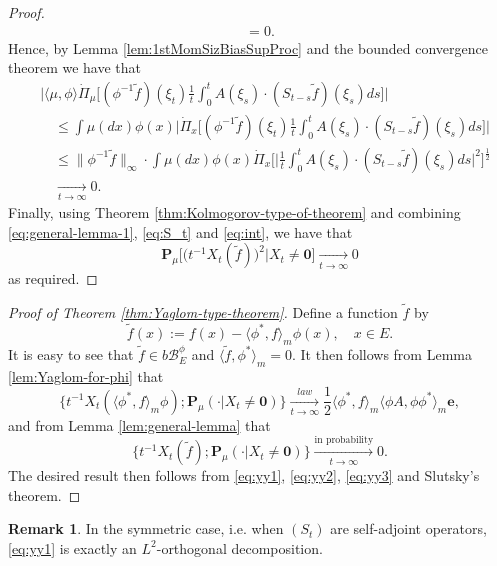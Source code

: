 \documentclass[UTF8]{pkuthss}
\theoremstyle{plain}
\theoremstyle{definition}
\newtheorem{rem}[thm]{Remark}
\numberwithin{equation}{section}
\begin{document}
\begin{proof}
\begin{align}
	= 0.
\end{align}
	Hence, by Lemma \ref{lem:1stMomSizBiasSupProc} and the bounded convergence theorem we have that
\begin{align}\label{eq:int}
	&\big| \langle \mu , \phi \rangle \dot{\Pi}_{\mu}\big[(\phi^{-1}\tilde f)(\xi_t)\frac{1}{t}\int_0^t A(\xi_s)\cdot (S_{t-s} \tilde f)(\xi_s)ds\big]\big|\\
	&\quad\leq \int \mu(dx)\phi(x) \big|\dot{\Pi}_x \big[(\phi^{-1}\tilde f)(\xi_t)\frac{1}{t}\int_0^t A(\xi_s)\cdot (S_{t-s} \tilde f)(\xi_s)ds\big]\big| \\
	&\quad\leq \|\phi^{-1} \tilde f\|_\infty \cdot \int \mu(dx)\phi(x) \dot{\Pi}_{x}\Big[ \big| \frac{1}{t}\int_0^t A(\xi_s)\cdot (S_{t-s} \tilde f)(\xi_s)ds \big|^2 \Big]^{\frac{1}{2}}\\
	&\quad \xrightarrow[t\to\infty]{} 0.
\end{align}
	Finally, using  Theorem \ref{thm:Kolmogorov-type-of-theorem} and combining  \eqref{eq:general-lemma-1}, \eqref{eq:S_t} and  \eqref{eq:int},   we have that
\[
	\mathbf P_{\mu}\big[\big(t^{-1}X_t(\tilde f)\big)^2\big|X_t \neq \mathbf 0\big]
	\xrightarrow[t\to\infty]{} 0
\]
	as required.
\end{proof}
\begin{proof}[Proof of Theorem \ref{thm:Yaglom-type-theorem}]
	Define a function $\tilde f$ by
\begin{equation}\label{eq:yy1}
	\tilde f(x)
	:=f(x) - \langle \phi^*,f\rangle_m \phi(x),
	\quad x\in E.
\end{equation}
	It is easy to see that $\tilde f\in b\mathscr B^\phi_E$ and $\langle\tilde f,\phi^* \rangle_m = 0$.
	It then follows from Lemma \ref{lem:Yaglom-for-phi} that
\begin{equation}\label{eq:yy2}
	\big\{ t^{-1}X_t(\langle \phi^*,f\rangle_m \phi);\mathbf P_\mu(\cdot | X_t\neq \mathbf 0)\big\}
	\xrightarrow[t\to\infty]{law} \frac{1}{2}\langle \phi^*,f\rangle_m\langle \phi A, \phi\phi^*\rangle_m \mathbf e,
\end{equation}
	and from Lemma \ref{lem:general-lemma} that
\begin{equation}\label{eq:yy3}
	\big\{ t^{-1} X_t(\tilde f) ; \mathbf P_\mu(\cdot|X_t \neq \mathbf 0)\big\}
	\xrightarrow[t\to\infty]{\text{in probability}}0.
\end{equation}
	The desired result then follows from \eqref{eq:yy1}, \eqref{eq:yy2}, \eqref{eq:yy3} and Slutsky's theorem.
\end{proof}


\begin{rem}
	In the symmetric case, i.e. when $(S_t)$ are self-adjoint operators,  \eqref{eq:yy1} is exactly an $L^2$-orthogonal decomposition.
\end{rem}
\end{document}
